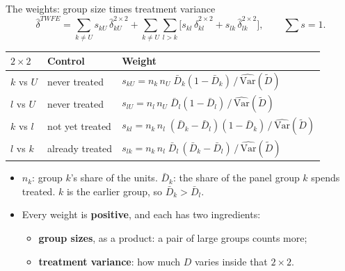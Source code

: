 \documentclass[
  11pt,
  ignorenonframetext,
  aspectratio=169,
]{beamer}
\providecommand{\tightlist}{%
  \setlength{\itemsep}{0pt}\setlength{\parskip}{0pt}}
\begin{document}
\begin{frame}{The weights: group size times treatment variance}
\protect{}\label{the-weights-group-size-times-treatment-variance}
\[
\hat\delta^{TWFE} = \sum_{k \ne U} s_{kU}\,\hat\delta^{2\times2}_{kU} + \sum_{k \ne U}\sum_{l > k}\big[s_{kl}\,\hat\delta^{2\times2}_{kl} + s_{lk}\,\hat\delta^{2\times2}_{lk}\big], \qquad \sum s = 1.
\]

\begin{center}\small
\begin{tabular}{lll}
\toprule
$2 \times 2$ & Control & Weight \\
\midrule
$k$ vs $U$ & never treated & $s_{kU} = n_k\, n_U\; \bar D_k(1 - \bar D_k) \,\big/\, \widehat{\text{Var}}(\tilde D)$ \\[3pt]
$l$ vs $U$ & never treated & $s_{lU} = n_l\, n_U\; \bar D_l(1 - \bar D_l) \,\big/\, \widehat{\text{Var}}(\tilde D)$ \\[3pt]
$k$ vs $l$ & not yet treated & $s_{kl} = n_k\, n_l\; (\bar D_k - \bar D_l)(1 - \bar D_k) \,\big/\, \widehat{\text{Var}}(\tilde D)$ \\[3pt]
$l$ vs $k$ & already treated & $s_{lk} = n_k\, n_l\; \bar D_l\,(\bar D_k - \bar D_l) \,\big/\, \widehat{\text{Var}}(\tilde D)$ \\
\bottomrule
\end{tabular}
\end{center}

\begin{itemize}
\tightlist
\item
  \(n_k\): group \(k\)'s share of the units. \(\bar D_k\): the share of
  the panel group \(k\) spends treated. \(k\) is the earlier group, so
  \(\bar D_k > \bar D_l\).
\item
  Every weight is \textbf{positive}, and each has two ingredients:

  \begin{itemize}
  \tightlist
  \item
    \textbf{group sizes}, as a product: a pair of large groups counts
    more;
  \item
    \textbf{treatment variance}: how much \(D\) varies inside that
    \(2 \times 2\).
  \end{itemize}
\end{itemize}
\end{frame}
\end{document}
